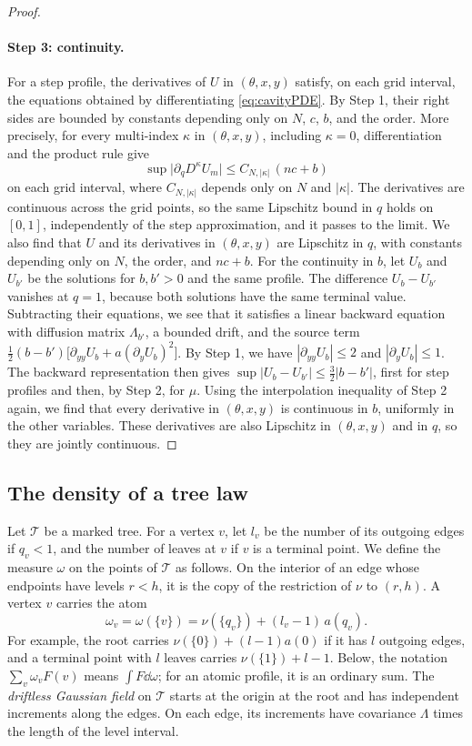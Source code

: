 \begin{proof}
\paragraph{Step 3: continuity.}
For a step profile, the derivatives of $U$ in $(\theta,x,y)$ satisfy, on
each grid interval, the equations obtained by differentiating
\eqref{eq:cavityPDE}. By Step 1, their right sides are bounded by
constants depending only on $N$, $c$, $b$, and the order. More precisely,
for every multi-index $\kappa$ in $(\theta,x,y)$, including $\kappa=0$,
differentiation and the product rule give
\[
 \sup\bigl|\partial_qD^\kappa U_m\bigr|\le C_{N,|\kappa|}\,(nc+b)
\]
on each grid interval, where $C_{N,|\kappa|}$ depends only on $N$ and
$|\kappa|$. The derivatives are continuous across the grid points, so the
same Lipschitz bound in $q$ holds on $[0,1]$, independently of the step
approximation, and it passes to the limit. We also find that
$U$ and its derivatives in $(\theta,x,y)$ are Lipschitz in $q$,
with constants depending only on $N$, the order, and $nc+b$. For the continuity in
$b$, let $U_b$ and $U_{b'}$ be the solutions for $b,b'>0$ and the same
profile. The difference $U_b-U_{b'}$ vanishes at $q=1$, because both solutions
have the same terminal value. Subtracting their equations, we see that it
satisfies a linear backward equation with diffusion matrix
$\Lambda_{b'}$, a bounded drift, and the source term
$\frac12(b-b')\bigl[\partial_{yy}U_b+a(\partial_yU_b)^2\bigr]$. By Step 1,
we have $|\partial_{yy}U_b|\le2$ and $|\partial_yU_b|\le1$. The backward
representation then gives $\sup|U_b-U_{b'}|\le\frac32|b-b'|$, first for
step profiles and then, by Step 2, for $\mu$. Using the interpolation
inequality of Step 2 again, we find that every derivative in
$(\theta,x,y)$ is continuous in $b$, uniformly in the other variables.
These derivatives are also Lipschitz in $(\theta,x,y)$ and in $q$, so
they are jointly continuous.
\end{proof}

\subsection{The density of a tree law}

Let $\mathcal T$ be a marked tree. For a vertex $v$, let $l_v$ be the
number of its outgoing edges if $q_v<1$, and the number of leaves at $v$
if $v$ is a terminal point. We define the measure $\omega$ on the points
of $\mathcal T$ as follows. On the interior of an edge whose endpoints
have levels $r<h$, it is the copy of the restriction of $\nu$ to $(r,h)$.
A vertex $v$ carries the atom
\[
 \omega_v=\omega(\{v\})=\nu(\{q_v\})+(l_v-1)\,a(q_v).
\]
For example, the root carries $\nu(\{0\})+(l-1)a(0)$ if it has $l$
outgoing edges, and a terminal point with $l$ leaves carries
$\nu(\{1\})+l-1$. Below, the notation $\sum_v\omega_vF(v)$ means
$\int F\dd\omega$; for an atomic profile, it is an ordinary sum. The
\emph{driftless Gaussian field} on $\mathcal T$ starts at the origin at
the root and has independent increments along the edges. On each edge,
its increments have covariance $\Lambda$ times the length of the level
interval.


